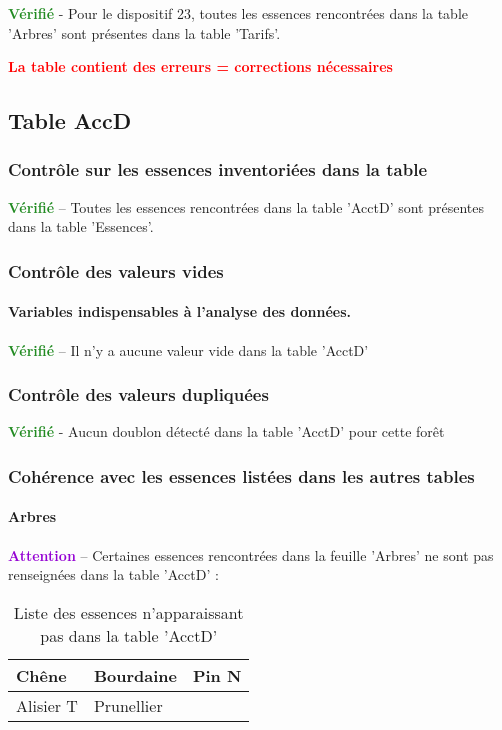 \documentclass[a4paper]{article}
\begin{document}
\textcolor{ForestGreen}{\textbf{Vérifié}} - Pour le dispositif 23, toutes les essences rencontrées dans la table 'Arbres' sont présentes dans la table 'Tarifs'.\\

\FloatBarrier\begin{center}
\textcolor{Red}{\textbf{La table contient des erreurs = corrections nécessaires}}
\end{center}


\FloatBarrier

\subsection{Table AccD}
\subsubsection{Contrôle sur les essences inventoriées dans la table}\textcolor{ForestGreen}{\textbf{Vérifié}} -- Toutes les essences rencontrées dans la table 'AcctD' sont présentes dans la table 'Essences'.\FloatBarrier \subsubsection{Contrôle des valeurs vides}\paragraph{Variables indispensables à l'analyse des données.}\textcolor{ForestGreen}{\textbf{Vérifié}} -- Il n'y a aucune valeur vide dans la table 'AcctD'\\\subsubsection{Contrôle des valeurs dupliquées}\textcolor{ForestGreen}{\textbf{Vérifié}} - Aucun doublon détecté dans la table 'AcctD' pour cette forêt\\\subsubsection{Cohérence avec les essences listées dans les autres tables}\paragraph{Arbres}\textcolor{DarkViolet}{\textbf{Attention}} -- Certaines essences rencontrées dans la feuille 'Arbres' ne sont pas renseignées dans la table 'AcctD' :\\%
\begin{table}[ht]
\centering
\begingroup\scriptsize
\begin{tabular}{|M{1.5cm}|M{1.5cm}|M{1.5cm}|}
   \hline
Chêne & Bourdaine & Pin N \\ 
   \hline
Alisier T & Prunellier &  \\ 
   \hline
\end{tabular}
\endgroup
\caption{\footnotesize{Liste des essences n'apparaissant pas dans la table 'AcctD'}} 
\label{TabEssArbres_AcctD}
\end{table}
\FloatBarrier
\end{document}

